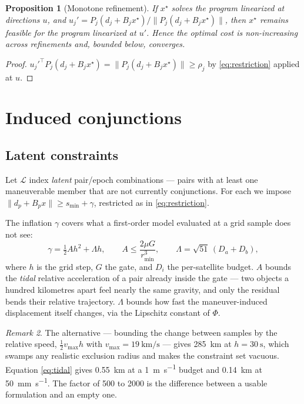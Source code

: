 \documentclass[11pt]{article}
\newtheorem{proposition}{Proposition}
\theoremstyle{definition}
\theoremstyle{remark}
\newtheorem{remark}[proposition]{Remark}
\newcommand{\norm}[1]{\lVert #1 \rVert}
\begin{document}
\begin{proposition}[Monotone refinement]
\label{prop:scp}
If $x^\star$ solves the program linearized at directions $u$, and
$u_j' = P_j(d_j + B_jx^\star)/\norm{P_j(d_j+B_jx^\star)}$, then $x^\star$
remains feasible for the program linearized at $u'$. Hence the optimal cost is
non-increasing across refinements and, bounded below, converges.
\end{proposition}

\begin{proof}
$u_j'^{\!\top}P_j(d_j+B_jx^\star) = \norm{P_j(d_j+B_jx^\star)} \ge \rho_j$ by
\eqref{eq:restriction} applied at $u$.
\end{proof}

\section{Induced conjunctions}

\subsection{Latent constraints}

Let $\mathcal{L}$ index \emph{latent} pair/epoch combinations --- pairs with at
least one maneuverable member that are not currently conjunctions. For each we
impose $\norm{d_p + B_p x} \ge s_{\min} + \gamma$, restricted as in
\eqref{eq:restriction}.

The inflation $\gamma$ covers what a first-order model evaluated at a grid
sample does not see:
\begin{equation}
\gamma = \tfrac12 A h^2 + \Lambda h,
\qquad
A \le \frac{2\mu G}{r_{\min}^{3}},
\qquad
\Lambda = \sqrt{51}\,(D_a + D_b),
\label{eq:tidal}
\end{equation}
where $h$ is the grid step, $G$ the gate, and $D_i$ the per-satellite budget.
$A$ bounds the \emph{tidal} relative acceleration of a pair already inside the
gate --- two objects a hundred kilometres apart feel nearly the same gravity,
and only the residual bends their relative trajectory. $\Lambda$ bounds how
fast the maneuver-induced displacement itself changes, via the Lipschitz
constant of $\Phi$.

\begin{remark}
The alternative --- bounding the change between samples by the relative speed,
$\tfrac12 v_{\max} h$ with $v_{\max} = \SI{19}{\kilo\meter\per\second}$ ---
gives \SI{285}{\kilo\meter} at $h = \SI{30}{\second}$, which swamps any
realistic exclusion radius and makes the constraint set vacuous. Equation
\eqref{eq:tidal} gives \SI{0.55}{\kilo\meter} at a \SI{1}{\meter\per\second}
budget and \SI{0.14}{\kilo\meter} at \SI{50}{\milli\meter\per\second}. The
factor of \num{500} to \num{2000} is the difference between a usable
formulation and an empty one.
\end{remark}
\end{document}
